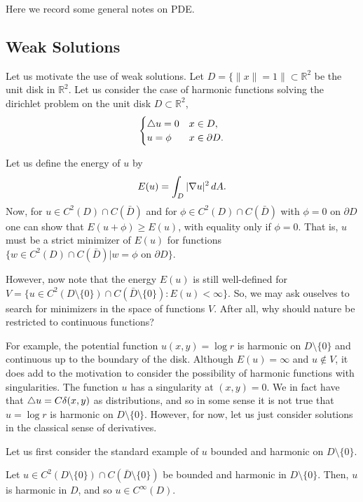 Here we record some general notes on PDE.

\subsection{Weak Solutions}

Let us motivate the use of weak solutions. Let $D = \{\|x\| = 1\|\subset \mathbb R^2$ be the unit disk in $\mathbb R^2$. Let us consider the case of harmonic functions solving the dirichlet problem on the unit disk $D\subset\mathbb R^2$, 
\begin{equation}
\begin{cases}
\triangle u = 0 & x\in D, \\
u = \phi & x\in \partial D.
\end{cases}
\end{equation}

Let us define the energy of $u$ by
\begin{equation}
E(u) = \int_D |\nabla u|^2 \, dA.
\end{equation}
Now, for $u \in C^2(D)\cap C(\bar D)$ and for $\phi\in C^2(D)\cap C(\bar D)$ with $\phi = 0$ on $\partial D$ one can show that $E(u+\phi) \geq E(u)$, with equality only if $\phi = 0.$ That is, $u$ must be a strict minimizer of $E(u)$ for functions $\{ w \in C^2(D) \cap C(\bar D) | w = \phi \text{ on } \partial D\}$.

However, now note that the energy $E(u)$ is still well-defined for $V = \{u\in C^2(D\setminus\{0\})\cap C(\bar D \setminus \{0\}) : E(u) < \infty\}.$ So, we may ask ouselves to search for minimizers in the space of functions $V$. After all, why should nature be restricted to continuous functions?

For example, the potential function $u(x,y) = \log r$ is harmonic on $D\setminus\{0\}$ and continuous up to the boundary of the disk. Although $E(u) = \infty$ and $u\not\in V$, it does add to the motivation to consider the possibility of harmonic functions with singularities. The function $u$ has a singularity at $(x,y) = 0$. We in fact have that $\triangle u = C \delta(x,y)$ as distributions, and so in some sense it is not true that $u = \log r$ is harmonic on $D\setminus \{0\}$. However, for now, let us just consider solutions in the classical sense of derivatives.

Let us first consider the standard example of $u$ bounded and harmonic on $D\setminus\{0\}$.

\begin{proposition}
Let $u \in C^2(D\setminus\{0\})\cap C(\bar D\setminus \{0\})$ be bounded and harmonic in $D\setminus\{0\}$. Then, $u$ is harmonic in $D$, and so $u\in C^\infty(D)$.
\end{proposition}


